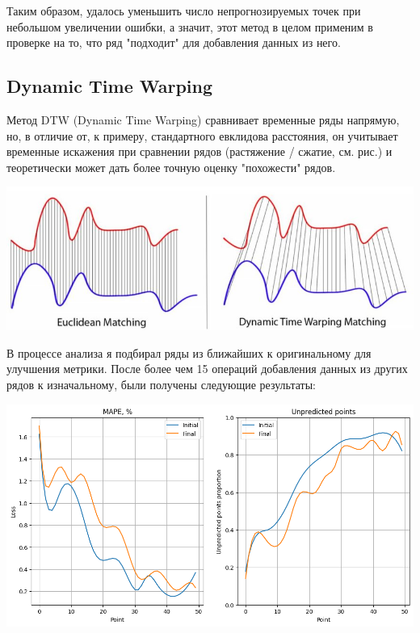 \documentclass[a4paper, 12pt]{extarticle}
\begin{document}
Таким образом, удалось уменьшить число непрогнозируемых точек при небольшом увеличении ошибки, а значит, этот метод в целом применим в проверке на то, что ряд "подходит" для добавления данных из него.

\subsection{Dynamic Time Warping}

Метод DTW (Dynamic Time Warping) сравнивает временные ряды напрямую, но, в отличие от, к примеру, стандартного евклидова расстояния, он учитывает временные искажения при сравнении рядов (растяжение / сжатие, см. рис.) и теоретически может дать более точную оценку "похожести" рядов.

\begin{center}
    \includegraphics[width=\textwidth]{img/dtw_vis.png}
\end{center}

В процессе анализа я подбирал ряды из ближайших к оригинальному для улучшения метрики. После более чем 15 операций добавления данных из других рядов к изначальному, были получены следующие результаты:

\begin{center}
    \includegraphics[width=\textwidth]{img/dtw.png}
\end{center}
\end{document}

